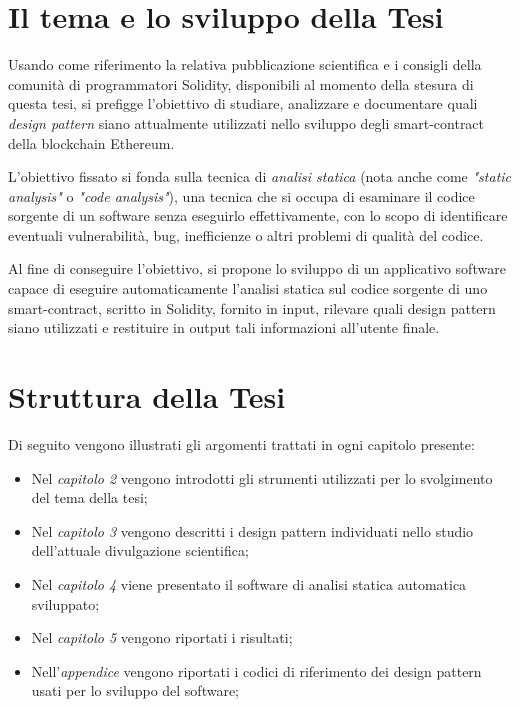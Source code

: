 \section{Il tema e lo sviluppo della Tesi}
Usando come riferimento la relativa pubblicazione scientifica e i consigli della comunità di programmatori Solidity, disponibili al momento della stesura di questa tesi, si prefigge l'obiettivo di studiare, analizzare e documentare quali \textit{design pattern} siano attualmente utilizzati nello sviluppo degli smart-contract della blockchain Ethereum.

L'obiettivo fissato si fonda sulla tecnica di \textit{analisi statica} (nota anche come \textit{"static analysis"} o \textit{"code analysis"}), una tecnica che si occupa di esaminare il codice sorgente di un software senza eseguirlo effettivamente, con lo scopo di identificare eventuali vulnerabilità, bug, inefficienze o altri problemi di qualità del codice. 

Al fine di conseguire l'obiettivo, si propone lo sviluppo di un applicativo software capace di eseguire automaticamente l'analisi statica sul codice sorgente di uno smart-contract, scritto in Solidity, fornito in input, rilevare quali design pattern siano utilizzati e restituire in output tali informazioni all'utente finale. 


\section{Struttura della Tesi}
Di seguito vengono illustrati gli argomenti trattati in ogni capitolo presente:
\begin{itemize}
	\item Nel \textit{capitolo 2} vengono introdotti gli strumenti utilizzati per lo svolgimento del tema della tesi;
	\item Nel \textit{capitolo 3} vengono descritti i design pattern individuati nello studio dell'attuale divulgazione scientifica;
	\item Nel \textit{capitolo 4} viene presentato il software di analisi statica automatica sviluppato;
	\item Nel \textit{capitolo 5} vengono riportati i risultati;
	\item Nell'\textit{appendice} vengono riportati i codici di riferimento dei design pattern usati per lo sviluppo del software;
\end{itemize}